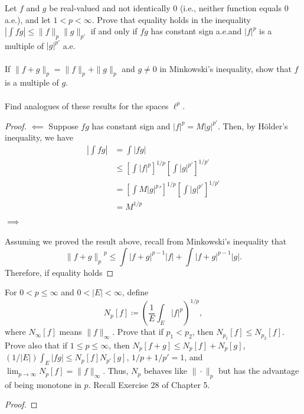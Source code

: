 \begin{problem}
Let $f$ and $g$ be real-valued and not identically $0$ (i.e., neither
function equals $0$ a.e.), and let $1<p<\infty$. Prove that equality holds
in the inequality $\left|\int fg\right|\leq\|f\|_p\|g\|_{p'}$ if and only if
$fg$ has constant sign a.e.\@ and $|f|^p$ is a multiple of $|g|^{p'}$ a.e.
\\\\
If $\|f+g\|_p=\|f\|_p+\|g\|_{p}$ and $g\neq 0$ in Minkowski's inequality,
show that $f$ is a multiple of $g$.
\\\\
Find analogues of these results for the spaces $\ell^p$.
\end{problem}
\begin{proof}
$\impliedby$ Suppose $fg$ has constant sign and $|f|^p=M|g|^{p'}$. Then, by
Hölder's inequality, we have
\[
\begin{aligned}
\left|\int fg\right|
&=\int |fg|\\
&\leq\left[\int |f|^p\right]^{1/p}
\left[\int|g|^{p'}\right]^{1/p'}\\
&=\left[\int M|g|^p'\right]^{1/p}
\left[\int|g|^{p'}\right]^{1/p'}\\
&=M^{1/p}
\end{aligned}
\]

$\implies$
\\\\
Assuming we proved the result above, recall from Minkowski's inequality
that
\[
{\|f+g\|_p}^p\leq\int|f+g|^{p-1}|f|+\int|f+g|^{p-1}|g|.
\]
Therefore, if equality holds
\end{proof}
\newpage

\begin{problem}
For $0<p\leq\infty$ and $0<|E|<\infty$, define
\[
N_p[f]\coloneqq\left(\frac{1}{E}\int_E|f|^p\right)^{1/p},
\]
where $N_\infty[f]$ means $\|f\|_\infty$. Prove that if $p_1<p_2$, then
$N_{p_1}[f]\leq N_{p_2}[f]$. Prove also that if $1\leq p\leq \infty$, then
$N_p[f+g]\leq N_p[f]+N_p[g]$, $(1/|E|)\int_E|fg|\leq N_p[f]N_{p'}[g]$,
$1/p+1/p'=1$, and $\lim_{p\to\infty} N_p[f]=\|f\|_\infty$. Thus, $N_p$
behaves like $\|\cdot\|_p$ but has the advantage of being monotone in
$p$. Recall Exercise 28 of Chapter 5.
\end{problem}
\begin{proof}
\end{proof}
\newpage

